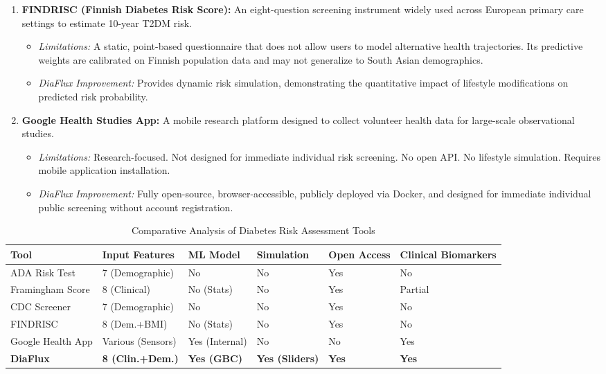 \documentclass[12pt,a4paper]{report}
\begin{document}
\begin{enumerate}
    \item \textbf{FINDRISC (Finnish Diabetes Risk Score):} An eight-question screening instrument widely used across European primary care settings to estimate 10-year T2DM risk.
    \begin{itemize}
        \item \textit{Limitations:} A static, point-based questionnaire that does not allow users to model alternative health trajectories. Its predictive weights are calibrated on Finnish population data and may not generalize to South Asian demographics.
        \item \textit{DiaFlux Improvement:} Provides dynamic risk simulation, demonstrating the quantitative impact of lifestyle modifications on predicted risk probability.
    \end{itemize}

    \item \textbf{Google Health Studies App:} A mobile research platform designed to collect volunteer health data for large-scale observational studies.
    \begin{itemize}
        \item \textit{Limitations:} Research-focused. Not designed for immediate individual risk screening. No open API. No lifestyle simulation. Requires mobile application installation.
        \item \textit{DiaFlux Improvement:} Fully open-source, browser-accessible, publicly deployed via Docker, and designed for immediate individual public screening without account registration.
    \end{itemize}
\end{enumerate}

\begin{table}[H]
\centering
\caption{Comparative Analysis of Diabetes Risk Assessment Tools}
\label{tab:system_comparison}
\begin{tabularx}{\textwidth}{lXXXXX}
\toprule
\textbf{Tool} & \textbf{Input Features} & \textbf{ML Model} & \textbf{Simulation} & \textbf{Open Access} & \textbf{Clinical Biomarkers} \\
\midrule
ADA Risk Test          & 7 (Demographic)       & No            & No            & Yes     & No \\
Framingham Score       & 8 (Clinical)          & No (Stats)    & No            & Yes     & Partial \\
CDC Screener           & 7 (Demographic)       & No            & No            & Yes     & No \\
FINDRISC               & 8 (Dem.+BMI)          & No (Stats)    & No            & Yes     & No \\
Google Health App      & Various (Sensors)     & Yes (Internal)& No            & No      & Yes \\
\textbf{DiaFlux}       & \textbf{8 (Clin.+Dem.)} & \textbf{Yes (GBC)} & \textbf{Yes (Sliders)} & \textbf{Yes} & \textbf{Yes} \\
\bottomrule
\end{tabularx}
\end{table}
\end{document}
